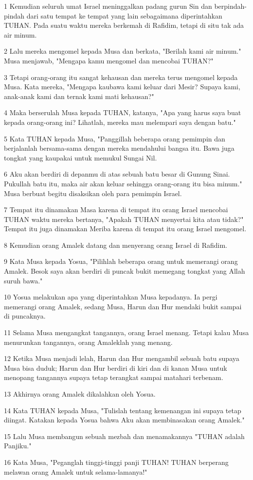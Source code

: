 \par 1 Kemudian seluruh umat Israel meninggalkan padang gurun Sin dan berpindah-pindah dari satu tempat ke tempat yang lain sebagaimana diperintahkan TUHAN. Pada suatu waktu mereka berkemah di Rafidim, tetapi di situ tak ada air minum.
\par 2 Lalu mereka mengomel kepada Musa dan berkata, "Berilah kami air minum." Musa menjawab, "Mengapa kamu mengomel dan mencobai TUHAN?"
\par 3 Tetapi orang-orang itu sangat kehausan dan mereka terus mengomel kepada Musa. Kata mereka, "Mengapa kaubawa kami keluar dari Mesir? Supaya kami, anak-anak kami dan ternak kami mati kehausan?"
\par 4 Maka berserulah Musa kepada TUHAN, katanya, "Apa yang harus saya buat kepada orang-orang ini? Lihatlah, mereka mau melempari saya dengan batu."
\par 5 Kata TUHAN kepada Musa, "Panggillah beberapa orang pemimpin dan berjalanlah bersama-sama dengan mereka mendahului bangsa itu. Bawa juga tongkat yang kaupakai untuk memukul Sungai Nil.
\par 6 Aku akan berdiri di depanmu di atas sebuah batu besar di Gunung Sinai. Pukullah batu itu, maka air akan keluar sehingga orang-orang itu bisa minum." Musa berbuat begitu disaksikan oleh para pemimpin Israel.
\par 7 Tempat itu dinamakan Masa karena di tempat itu orang Israel mencobai TUHAN waktu mereka bertanya, "Apakah TUHAN menyertai kita atau tidak?" Tempat itu juga dinamakan Meriba karena di tempat itu orang Israel mengomel.
\par 8 Kemudian orang Amalek datang dan menyerang orang Israel di Rafidim.
\par 9 Kata Musa kepada Yosua, "Pilihlah beberapa orang untuk memerangi orang Amalek. Besok saya akan berdiri di puncak bukit memegang tongkat yang Allah suruh bawa."
\par 10 Yosua melakukan apa yang diperintahkan Musa kepadanya. Ia pergi memerangi orang Amalek, sedang Musa, Harun dan Hur mendaki bukit sampai di puncaknya.
\par 11 Selama Musa mengangkat tangannya, orang Israel menang. Tetapi kalau Musa menurunkan tangannya, orang Amaleklah yang menang.
\par 12 Ketika Musa menjadi lelah, Harun dan Hur mengambil sebuah batu supaya Musa bisa duduk; Harun dan Hur berdiri di kiri dan di kanan Musa untuk menopang tangannya supaya tetap terangkat sampai matahari terbenam.
\par 13 Akhirnya orang Amalek dikalahkan oleh Yosua.
\par 14 Kata TUHAN kepada Musa, "Tulislah tentang kemenangan ini supaya tetap diingat. Katakan kepada Yosua bahwa Aku akan membinasakan orang Amalek."
\par 15 Lalu Musa membangun sebuah mezbah dan menamakannya "TUHAN adalah Panjiku."
\par 16 Kata Musa, "Peganglah tinggi-tinggi panji TUHAN! TUHAN berperang melawan orang Amalek untuk selama-lamanya!"

